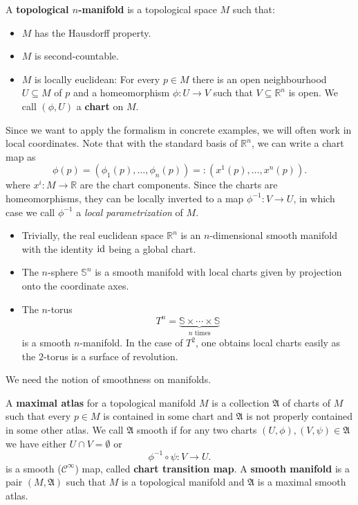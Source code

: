 \begin{definition}
    A \textbf{topological $n$-manifold} is a topological space $M$ such that:
    \begin{itemize}
        \item $M$ has the Hausdorff property.
        \item $M$ is second-countable.
        \item $M$ is locally euclidean: For every $p \in M$ there is an open neighbourhood $U \subseteq M$ of $p$ and a homeomorphism $\phi: U \to V$ such that $V \subseteq \mathbb{R}^n$ is open. We call $(\phi, U)$ a \textbf{chart} on $M$.
    \end{itemize}
\end{definition}
Since we want to apply the formalism in concrete examples, we will often work in local coordinates. Note that with the standard basis of $\mathbb{R}^n$, we can write a chart map as 
\[
\phi(p)=(\phi_1(p), \dots, \phi_n(p)) =: (x^1(p), \dots, x^n(p))
.\] where $x^i: M \to \mathbb{R}$ are the chart components. Since the charts are homeomorphisms, they can be locally inverted to a map $\phi^{-1}: V \to U$, in which case we call $\phi^{-1}$ a \emph{local parametrization} of $M$.
\begin{eg}
    \begin{itemize}
        \item Trivially, the real euclidean space $\mathbb{R}^n$ is an $n$-dimensional smooth manifold with the identity $\operatorname{id}$ being a global chart.
        \item The $n$-sphere $\mathbb{S}^n$ is a smooth manifold with local charts given by projection onto the coordinate axes.
    \item The $n$-torus \[T^n = \underbrace{\mathbb{S} \times \cdots \times \mathbb{S}}_{n\text{ times}}\] is a smooth $n$-manifold. In the case of $T^2$, one obtains local charts easily as the $2$-torus is a surface of revolution. 
    \end{itemize}
\end{eg}
We need the notion of smoothness on manifolds.
\begin{definition}
    A \textbf{maximal atlas} for a topological manifold $M$ is a collection $\mathfrak{A}$ of charts of $M$ such that every $p \in M$ is contained in some chart and $\mathfrak{A}$ is not properly contained in some other atlas. We call $\mathfrak{A}$ smooth if for any two charts $(U,\phi),(V,\psi) \in \mathfrak{A}$ we have either $U \cap V = \emptyset$ or \[
        \phi^{-1} \circ \psi: V \to U
    .\] is a smooth ($\mathcal{C}^\infty$) map, called \textbf{chart transition map}. A \textbf{smooth manifold} is a pair $(M, \mathfrak{A})$ such that $M$ is a topological manifold and $\mathfrak{A}$ is a maximal smooth atlas.
\end{definition}
